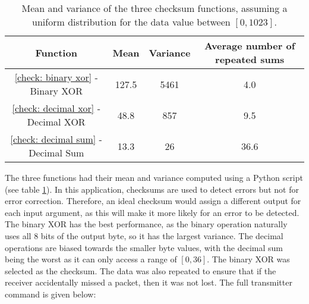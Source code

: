 \begin{table}[htb]
	\begin{center}
	\caption{Mean and variance of the three checksum functions, assuming a uniform distribution for the data value between $[0,1023]$.}
	\label{tab: checksums}
	\begin{tabular}{|c|c|c|c|}
		\hline
		\textbf{Function} & \textbf{Mean} & \textbf{Variance} & \textbf{Average number of repeated sums}\\
		\hline
		\ref{check: binary xor} - Binary XOR & 127.5 & 5461 & 4.0\\
		\ref{check: decimal xor} - Decimal XOR & 48.8 & 857 & 9.5\\
		\ref{check: decimal sum} - Decimal Sum & 13.3 & 26 & 36.6\\
		\hline
	\end{tabular}
	\end{center}
\end{table}

The three functions had their mean and variance computed using a Python script (see table \ref{tab: checksums}). In this application, checksums are used to detect errors but not for error correction. Therefore, an ideal checksum would assign a different output for each input argument, as this will make it more likely for an error to be detected. The binary XOR has the best performance, as the binary operation naturally uses all 8 bits of the output byte, so it has the largest variance. The decimal operations are biased towards the smaller byte values, with the decimal sum being the worst as it can only access a range of $[0,36]$. The binary XOR was selected as the checksum. The data was also repeated to ensure that if the receiver accidentally missed a packet, then it was not lost. The full transmitter command is given below:


